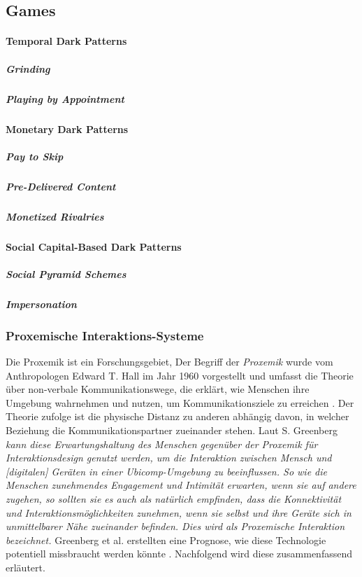\documentclass[a4paper]{article}
\newcommand{\todo}[1]{{\color{purple}{#1}}}
\begin{document}
\subsection{Games}
\label{sub:games}

\paragraph{Temporal Dark Patterns}

\subparagraph{Grinding}

\subparagraph{Playing by Appointment}

\paragraph{Monetary Dark Patterns}

\subparagraph{Pay to Skip}

\subparagraph{Pre-Delivered Content}

\subparagraph{Monetized Rivalries}

\paragraph{Social Capital-Based Dark Patterns}

\subparagraph{Social Pyramid Schemes}

\subparagraph{Impersonation}

\subsubsection{Proxemische Interaktions-Systeme}
\label{sub:proxemische_interaktions-systeme}{}
Die Proxemik ist ein Forschungsgebiet, 
Der Begriff der \textit{Proxemik} wurde vom Anthropologen Edward T. Hall im Jahr 1960 vorgestellt und umfasst die Theorie über non-verbale Kommunikationswege, die erklärt, wie Menschen ihre Umgebung wahrnehmen und nutzen, {}um Kommunikationsziele zu erreichen \cite{communicationstudies}. Der Theorie zufolge ist die physische Distanz zu anderen abhängig davon, in welcher Beziehung die Kommunikationspartner zueinander stehen. Laut S. Greenberg \glqq \textit{kann diese Erwartungshaltung des Menschen gegenüber der Proxemik für Interaktionsdesign genutzt werden, um die Interaktion zwischen Mensch und [digitalen] Geräten in einer Ubicomp-Umgebung \todo{Schönere Bezeichnung finden oder Definition formulieren} zu beeinflussen. So wie die Menschen zunehmendes Engagement und Intimität erwarten, wenn sie auf andere zugehen, so sollten sie es auch als natürlich empfinden, dass die Konnektivität und Interaktionsmöglichkeiten zunehmen, wenn sie selbst und ihre Geräte sich in unmittelbarer Nähe zueinander befinden. Dies wird als Proxemische Interaktion bezeichnet.}\grqq{} \cite{marquardt}\newline
Greenberg et al. erstellten eine Prognose, wie diese Technologie potentiell missbraucht werden könnte \cite{greenberg}. Nachfolgend wird diese zusammenfassend erläutert.
\end{document}
